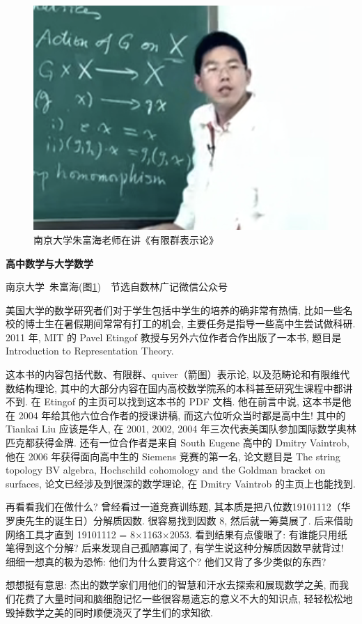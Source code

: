 	\begin{figure}[!htbp]
		\centering
		\includegraphics[scale=0.2]{2-prop-logic/figs/fhzhu}
		\caption{南京大学朱富海老师在讲《有限群表示论》}
		\label{fig:fhzhu}
	\end{figure}
\newpage
\begin{pas}
	\begin{center}
		\large \textbf{高中数学与大学数学}
	\end{center}
	\begin{center}
		南京大学~朱富海(图\ref{fig:fhzhu})~~节选自数林广记微信公众号
	\end{center}

	美国大学的数学研究者们对于学生包括中学生的培养的确非常有热情, 比如一些名校的博士生在暑假期间常常有打工的机会, 主要任务是指导一些高中生尝试做科研. 2011 年, MIT 的 Pavel Etingof 教授与另外六位作者合作出版了一本书, 题目是 Introduction to Representation Theory.
	

	
	这本书的内容包括代数、有限群、quiver（箭图）表示论, 以及范畴论和有限维代数结构理论, 其中的大部分内容在国内高校数学院系的本科甚至研究生课程中都讲不到. 在 Etingof 的主页可以找到这本书的 PDF 文档. 他在前言中说, 这本书是他在 2004 年给其他六位合作者的授课讲稿, 而这六位听众当时都是高中生! 其中的 Tiankai Liu 应该是华人, 在 2001, 2002, 2004 年三次代表美国队参加国际数学奥林匹克都获得金牌. 还有一位合作者是来自 South Eugene 高中的 Dmitry Vaintrob, 他在 2006 年获得面向高中生的 Siemens 竞赛的第一名, 论文题目是 The string topology BV algebra, Hochschild cohomology and the Goldman bracket on surfaces, 论文已经涉及到很深的数学理论, 在 Dmitry Vaintrob 的主页上也能找到.
	
	再看看我们在做什么? 曾经看过一道竞赛训练题, 其本质是把八位数19101112（华罗庚先生的诞生日）分解质因数. 很容易找到因数 8, 然后就一筹莫展了. 后来借助网络工具才直到 19101112 = 8×1163×2053. 看到结果有点傻眼了: 有谁能只用纸笔得到这个分解? 后来发现自己孤陋寡闻了, 有学生说这种分解质因数早就背过! 细细一想真的极为恐怖: 他们为什么要背这个? 他们又背了多少类似的东西?
	
	想想挺有意思: 杰出的数学家们用他们的智慧和汗水去探索和展现数学之美, 而我们花费了大量时间和脑细胞记忆一些很容易遗忘的意义不大的知识点, 轻轻松松地毁掉数学之美的同时顺便浇灭了学生们的求知欲.

\end{pas}
